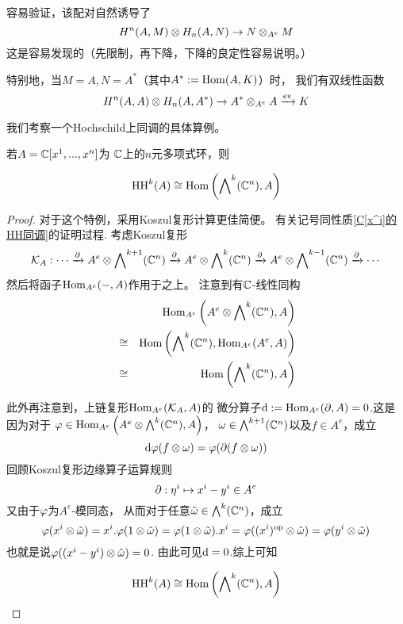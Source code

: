 容易验证，该配对自然诱导了
$$H^n(A,M)\otimes H_n(A,N)\to N\otimes_{A^e}M$$
这是容易发现的（先限制，再下降，下降的良定性容易说明。）

特别地，当$M=A,N=A^*$（其中$A^*:=\operatorname{Hom}(A,K)$）时，
我们有双线性函数
$$H^n(A,A)\otimes H_n(A,A^*)\to A^*\otimes_{A^e}A\xrightarrow{\operatorname{ev}}K$$ 


\vs

我们考察一个Hochschild上同调的具体算例。

\begin{prop}若$A=\mathbb{C}[x^1,...,x^n]$为
$\mathbb{C}$上的$n$元多项式环，则

$$\operatorname{HH}^k(A)\cong
\operatorname{Hom}\left(\bigwedge\nolimits^{k}(\mathbb{C}^n),A\right)$$
\end{prop}

\begin{proof}
对于这个特例，采用Koszul复形计算更佳简便。
有关记号同性质\ref{C[x^i]的HH同调}的证明过程.
考虑Koszul复形
$$
\mathcal{K}_A:\cdots
\xrightarrow{\partial}A^e\otimes\bigwedge\nolimits^{k+1}(\mathbb{C}^n)
\xrightarrow{\partial}A^e\otimes\bigwedge\nolimits^{k}(\mathbb{C}^n)
\xrightarrow{\partial}A^e\otimes\bigwedge\nolimits^{k-1}(\mathbb{C}^n)
\xrightarrow{\partial}\cdots
$$
然后将函子$\operatorname{Hom}_{A^e}(-,A)$作用于之上。
注意到有$\mathbb{C}$-线性同构
\begin{eqnarray*}
&&      \operatorname{Hom}_{A^e}\left(A^e\otimes\bigwedge\nolimits^{k}(\mathbb{C}^n),A\right)\\
&\cong& \operatorname{Hom}\left(\bigwedge\nolimits^{k}(\mathbb{C}^n),\operatorname{Hom}_{A^e}(A^e,A)\right)\\
&\cong& \operatorname{Hom}\left(\bigwedge\nolimits^{k}(\mathbb{C}^n),A\right)
\end{eqnarray*}

此外再注意到，上链复形$\operatorname{Hom}_{A^e}(\mathcal{K}_A,A)$的
微分算子$\mathrm{d}:=\operatorname{Hom}_{A^e}(\partial,A)=0$.这是因为对于
$\varphi\in\operatorname{Hom}_{A^e}\left(A^e\otimes\bigwedge\nolimits^{k}(\mathbb{C}^n),A\right)$，
$\omega\in\bigwedge\nolimits^{k+1}(\mathbb{C}^n)$以及$f\in A^e$，成立
$$\mathrm{d}\varphi(f\otimes\omega)=\varphi(\partial(f\otimes\omega))$$
回顾Koszul复形边缘算子运算规则
$$\partial:\eta^i\mapsto x^i-y^i\in A^e$$
又由于$\varphi$为$A^e$-模同态，
从而对于任意$\tilde{\omega}\in\bigwedge\nolimits^{k}(\mathbb{C}^n)$，成立
$$
\varphi(x^i\otimes\tilde{\omega})
=x^i.\varphi(1\otimes\tilde{\omega})
=\varphi(1\otimes\tilde{\omega}).x^i
=\varphi((x^i)^{\text{op}}\otimes\tilde{\omega})
=\varphi(y^i\otimes\tilde{\omega})$$
也就是说$\varphi((x^i-y^i)\otimes\tilde{\omega})=0$.
由此可见$\mathrm{d}=0$.综上可知

$$\operatorname{HH}^k(A)\cong
\operatorname{Hom}\left(\bigwedge\nolimits^{k}(\mathbb{C}^n),A\right)$$

\end{proof}

